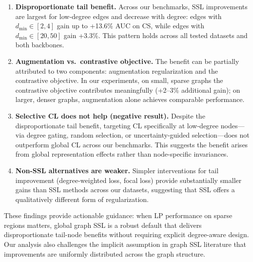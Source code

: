 \begin{enumerate}[leftmargin=*, itemsep=2pt]
    \item \textbf{Disproportionate tail benefit.} Across our benchmarks, SSL improvements are largest for low-degree edges and decrease with degree: edges with $d_{\min} \in [2,4]$ gain up to +13.6\% AUC on CS, while edges with $d_{\min} \in [20,50]$ gain +3.3\%. This pattern holds across all tested datasets and both backbones.

    \item \textbf{Augmentation vs.\ contrastive objective.} The benefit can be partially attributed to two components: augmentation regularization and the contrastive objective. In our experiments, on small, sparse graphs the contrastive objective contributes meaningfully (+2--3\% additional gain); on larger, denser graphs, augmentation alone achieves comparable performance.

    \item \textbf{Selective CL does not help (negative result).} Despite the disproportionate tail benefit, targeting CL specifically at low-degree nodes---via degree gating, random selection, or uncertainty-guided selection---does not outperform global CL across our benchmarks. This suggests the benefit arises from global representation effects rather than node-specific invariances.

    \item \textbf{Non-SSL alternatives are weaker.} Simpler interventions for tail improvement (degree-weighted loss, focal loss) provide substantially smaller gains than SSL methods across our datasets, suggesting that SSL offers a qualitatively different form of regularization.
\end{enumerate}

These findings provide actionable guidance: when LP performance on sparse regions matters, global graph SSL is a robust default that delivers disproportionate tail-node benefits without requiring explicit degree-aware design. Our analysis also challenges the implicit assumption in graph SSL literature that improvements are uniformly distributed across the graph structure.
